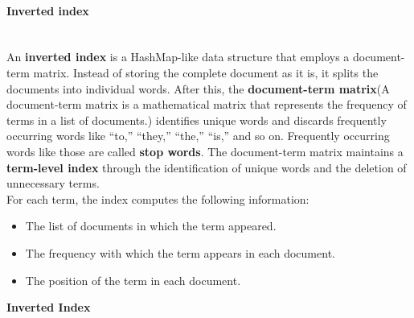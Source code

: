 \paragraph{Inverted index}\label{h3Ucj57crNYPulaopwc-W}
\\
An \textbf{inverted index} is a HashMap-like data structure that employs a document-term matrix. Instead of storing the complete document as it is, it splits the documents into individual words. After this, the \textbf{document-term matrix}(A document-term matrix is a mathematical matrix that represents the frequency of terms in a list of documents.) identifies unique words and discards frequently occurring words like ``to,'' ``they,'' ``the,'' ``is,'' and so on. Frequently occurring words like those are called \textbf{stop words}. The document-term matrix maintains a \textbf{term-level index} through the identification of unique words and the deletion of unnecessary terms.
\\
For each term, the index computes the following information:

\begin{itemize}
\item
\protect{}\label{6yERWb2sV_NTaYEmGGuyY}
The list of documents in which the term appeared.
\item
\protect{}\label{4mMHkwhATYqnCzgV9W_vl}
The frequency with which the term appears in each document.
\item
\protect{}\label{2s0QNXWGnyGtIEPib3C8K}
The position of the term in each document.
\end{itemize}

\textbf{Inverted Index}

